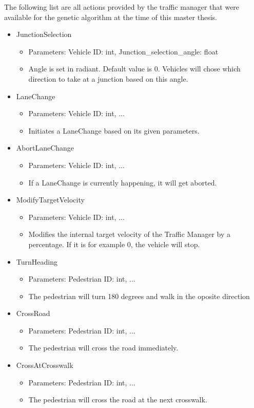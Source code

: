 The following list are all actions provided by the traffic manager that were available for the genetic algorithm at the time of this master thesis.
\begin{itemize}
	\item JunctionSelection
	\begin{itemize}
		\item Parameters: Vehicle ID: int, Junction\_selection\_angle: float
		\item Angle is set in radiant. Default value is 0. Vehicles will chose which direction to take at a junction based on this angle.
	\end{itemize}
	\item LaneChange
	\begin{itemize}
		\item Parameters: Vehicle ID: int, ...
		\item Initiates a LaneChange based on its given parameters.
	\end{itemize}
	\item AbortLaneChange
	\begin{itemize}
		\item Parameters: Vehicle ID: int, ...
		\item If a LaneChange is currently happening, it will get aborted.
	\end{itemize}
	\item ModifyTargetVelocity
	\begin{itemize}
		\item Parameters: Vehicle ID: int, ...
		\item Modifies the internal target velocity of the Traffic Manager by a percentage. If it is for example 0, the vehicle will stop.
	\end{itemize}
	\item TurnHeading
	\begin{itemize}
		\item Parameters: Pedestrian ID: int, ...
		\item The pedestrian will turn 180 degrees and walk in the oposite direction
	\end{itemize}
	\item CrossRoad
	\begin{itemize}
		\item Parameters: Pedestrian ID: int, ...
		\item The pedestrian will cross the road immediately.
	\end{itemize}
	\item CrossAtCrosswalk
	\begin{itemize}
		\item Parameters: Pedestrian ID: int, ...
		\item The pedestrian will cross the road at the next crosswalk.
	\end{itemize}
\end{itemize}

